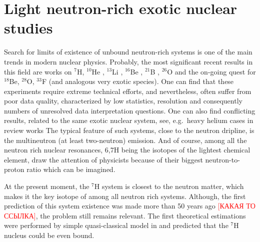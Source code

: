 \section{Light neutron-rich exotic nuclear studies}

Search for limits of existence of unbound neutron-rich systems is one of the main trends in modern nuclear physics.
Probably, the most significant recent results in this field are works on $^{7}$H, $^{10}$He \cite{Sidorchuk:2012,Kohley:2012,Jones:2015,Matta:2015}, $^{13}$Li \cite{Johansson:2010a,Kohley:2013b}, $^{16}$Be \cite{Spyrou:2012}, $^{21}$B \cite{Leblond:2018}, $^{26}$O \cite{Kohley:2013,Caesar:2013,Kondo:2016} and the on-going quest for $^{18}$Be, $^{28}$O, $^{33}$F \cite{Ahn:2019} (and analogous very exotic species). 
One can find that these experiments require extreme technical efforts, and nevertheless, often suffer from poor data quality, characterized by low statistics, resolution and consequently numbers of unresolved data interpretation questions.
One can also find conflicting results, related to the same exotic nuclear system, see, e.g.\ heavy helium cases in review works \cite{Grigorenko:2016,Fortune:2018}
The typical feature of such systems, close to the neutron dripline, is the multineutron (at least two-neutron) emission.
And of course, among all the neutron rich nuclear resonances, 6,7H being the isotopes of the lightest chemical element, draw the attention of physicists because of their biggest neutron-to-proton ratio which can be imagined.

At the present moment, the $^{7}$H system is closest to the neutron matter, which makes it the key isotope of among all neutron rich systems. 
Although, the first prediction of this system existence was made more than 50 years ago \textcolor{red}{[КАКАЯ ТО ССЫЛКА]}, the problem still remains relevant.
The first theoretical estimations were performed by simple quasi-classical model in \cite{Baz:1972} and predicted that the $^{7}$H nucleus could be even bound.

